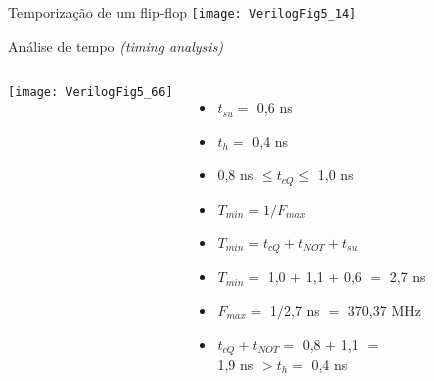 

\subtitle{Circuitos Sequenciais: Análise de Tempo} %



\begin{frame}
	\titlepage
\end{frame} 

\begin{frame}{Temporização de um flip-flop} \centering
    \texttt{[image: VerilogFig5\_14]} 
\end{frame}

\begin{frame}{Análise de tempo \textit{(timing analysis)}}   \centering
	\begin{columns}
            \texttt{[image: VerilogFig5\_66]} 
            \begin{itemize}
                \item $t_{su} =$ 0,6 ns
                \item $t_h =$ 0,4 ns
                \item 0,8 ns $\leq t_{cQ} \leq$ 1,0 ns
                \pause
                \item $T_{min} = 1/F_{max}$ 
                \item $T_{min} = t_{cQ} + t_{NOT} + t_{su}$ 
                \item $T_{min} = $ 1,0 $+$ 1,1 $+$ 0,6 $=$ 2,7 ns 
                \item $F_{max} = $ 1$/$2,7 ns $=$ 370,37 MHz
                \pause
                \item $t_{cQ} + t_{NOT} = $ 0,8 $+$ 1,1 $=$ \\ 1,9 ns $> t_h =$ 0,4 ns
            \end{itemize}
    \end{columns}
\end{frame}

